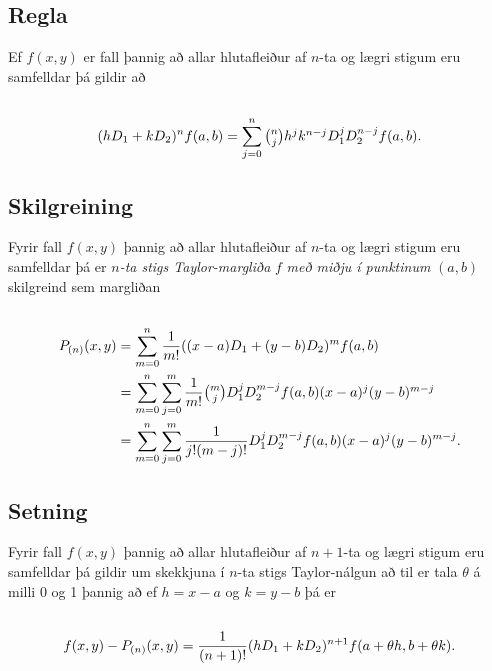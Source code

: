 \documentclass[a4paper,10pt,icelandic]{sphinxmanual}
\begin{document}
\subsection{Regla}
\label{Kafli2:regla}
Ef \(f(x,y)\) er fall þannig að allar hlutafleiður af \(n\)-ta
og lægri stigum eru samfelldar þá gildir að
\begin{gather}
\begin{split}\displaystyle\end{split}\notag\\\begin{split}(hD_1+kD_2)^nf(a,b)=\sum_{j=0}^n \textstyle{n\choose j}
h^jk^{n-j}D_1^jD_2^{n-j}f(a,b).\end{split}\notag
\end{gather}

\subsection{Skilgreining}
\label{Kafli2:id53}
Fyrir fall \(f(x,y)\) þannig að allar hlutafleiður af \(n\)-ta
og lægri stigum eru samfelldar þá er \(n\)\emph{-ta stigs
Taylor-margliða} \(f\) \emph{með miðju í punktinum} \((a,b)\)
skilgreind sem margliðan
\begin{gather}
\begin{split}\displaystyle\end{split}\notag\\\begin{split}\begin{aligned}
P_{(n)}(x,y)&= \sum_{m=0}^n \frac{1}{m!}((x-a)D_1+(y-b)D_2)^m f(a,b)\\
&=\sum_{m=0}^n\sum_{j=0}^m \frac{1}{m!}\textstyle{m\choose j}
D_1^jD_2^{m-j}f(a,b)(x-a)^j(y-b)^{m-j}\\
&=\sum_{m=0}^n\sum_{j=0}^m \frac{1}{j!(m-j)!}
D_1^jD_2^{m-j}f(a,b)(x-a)^j(y-b)^{m-j}.\end{aligned}\end{split}\notag
\end{gather}

\subsection{Setning}
\label{Kafli2:id54}
Fyrir fall \(f(x,y)\) þannig að allar hlutafleiður af \(n+1\)-ta
og lægri stigum eru samfelldar þá gildir um skekkjuna í \(n\)-ta
stigs Taylor-nálgun að til er tala \(\theta\) á milli 0 og 1 þannig
að ef \(h=x-a\) og \(k=y-b\) þá er
\begin{gather}
\begin{split}\displaystyle\end{split}\notag\\\begin{split}f(x,y)-P_{(n)}(x,y)=\frac{1}{(n+1)!}(hD_1+kD_2)^{n+1}
f(a+\theta h, b+\theta k).\end{split}\notag
\end{gather}
\end{document}
